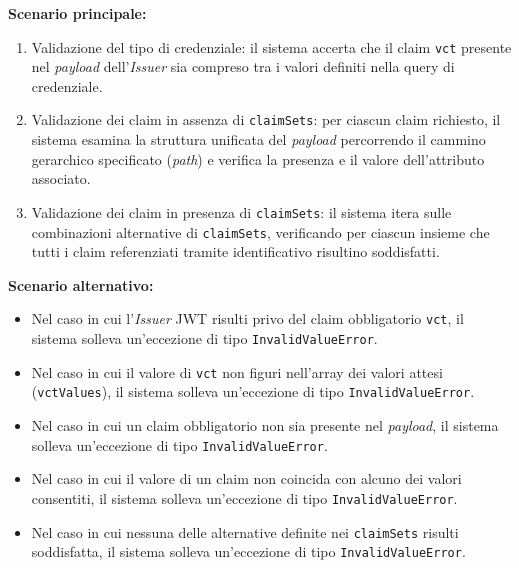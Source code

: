 \noindent\textbf{Scenario principale:}
\begin{enumerate}
    \item Validazione del tipo di credenziale: il sistema accerta che il claim \texttt{vct} presente nel \textit{payload} dell'\textit{Issuer} sia compreso tra i valori definiti nella query di credenziale.
    \item Validazione dei claim in assenza di \texttt{claimSets}: per ciascun claim richiesto, il sistema esamina la struttura unificata del \textit{payload} percorrendo il cammino gerarchico specificato (\textit{path}) e verifica la presenza e il valore dell'attributo associato.
    \item Validazione dei claim in presenza di \texttt{claimSets}: il sistema itera sulle combinazioni alternative di \texttt{claimSets}, verificando per ciascun insieme che tutti i claim referenziati tramite identificativo risultino soddisfatti.
\end{enumerate}

\noindent\textbf{Scenario alternativo:}
\begin{itemize}
    \item Nel caso in cui l'\textit{Issuer} JWT risulti privo del claim obbligatorio \texttt{vct}, il sistema solleva un'eccezione di tipo \texttt{InvalidValueError}.
    \item Nel caso in cui il valore di \texttt{vct} non figuri nell'array dei valori attesi (\texttt{vctValues}), il sistema solleva un'eccezione di tipo \texttt{InvalidValueError}.
    \item Nel caso in cui un claim obbligatorio non sia presente nel \textit{payload}, il sistema solleva un'eccezione di tipo \texttt{InvalidValueError}.
    \item Nel caso in cui il valore di un claim non coincida con alcuno dei valori consentiti, il sistema solleva un'eccezione di tipo \texttt{InvalidValueError}.
    \item Nel caso in cui nessuna delle alternative definite nei \texttt{claimSets} risulti soddisfatta, il sistema solleva un'eccezione di tipo \texttt{InvalidValueError}.
\end{itemize}

